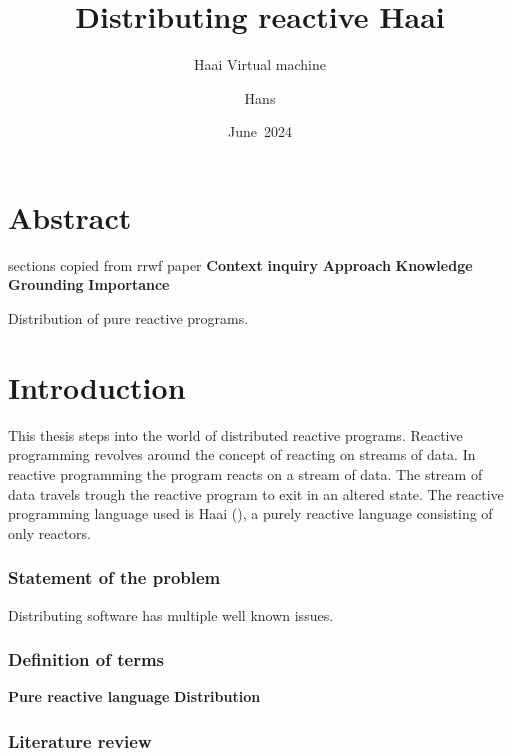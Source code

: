 \documentclass[a4paper]{book}
\title{Distributing reactive Haai}
\subtitle{Haai Virtual machine}
\author{Hans}
\date{June~2024}
\begin{document}
\frontmatter
\maketitle%


\chapter{Abstract}
sections copied from rrwf paper
\textbf{Context}
\textbf{inquiry}
\textbf{Approach}
\textbf{Knowledge}
\textbf{Grounding}
\textbf{Importance}

Distribution of pure reactive programs.

\tableofcontents%

\mainmatter%
\chapter{Introduction}
This thesis steps into the world of distributed reactive programs. Reactive programming revolves around the concept of reacting on streams of data. In reactive programming the program reacts on a stream of data. The stream of data travels trough the reactive program to exit in an altered state. The reactive programming language used is Haai (\cite{oeyen_reactive_2024}), a purely reactive language consisting of only reactors.
\subsection{Statement of the problem}
Distributing software has multiple well known issues. 

\subsection{Definition of terms}
\textbf{Pure reactive language}
\textbf{Distribution}

\subsection{Literature review}
\end{document}
